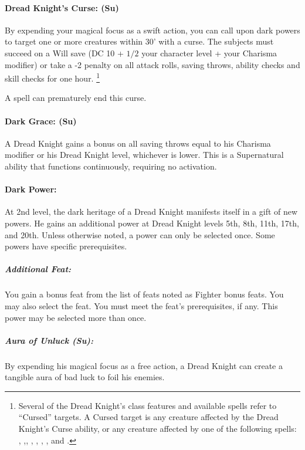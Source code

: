 \paragraph[Dread Knight's Curse]{Dread Knight's Curse: (Su)}
\label{sec:DreadKnightsCurse}
By expending your magical focus as a swift action, you can call upon dark powers to target one or more creatures within 30' with a curse.
The subjects must succeed on a Will save (DC 10 + $1/2$ your character level + your Charisma modifier) or take a -2 penalty on all attack rolls, saving throws, ability checks and skill checks for one hour.
\footnote{Several of the Dread Knight's class features and available spells refer to ``Cursed'' targets. A Cursed target is any creature affected by the Dread Knight's Curse ability, or any creature affected by one of the following spells: , ,, , , , ,  and .}

A  spell can prematurely end this curse.

\paragraph{Dark Grace: (Su)} A Dread Knight gains a bonus on all saving throws equal to his Charisma modifier or his Dread Knight level, whichever is lower.
This is a Supernatural ability that functions continuously, requiring no activation.

\paragraph{Dark Power:}
At 2nd level, the dark heritage of a Dread Knight manifests itself in a gift of new powers. He gains an additional power at Dread Knight levels 5th, 8th, 11th, 17th, and 20th. Unless otherwise noted, a power can only be selected once. Some powers have specific prerequisites.

\subparagraph{Additional Feat:}
You gain a bonus feat from the list of feats noted as Fighter bonus feats. You may also select the  feat. You must meet the feat's prerequisites, if any.
This power may be selected more than once.

\subparagraph{Aura of Unluck (Su):} 
By expending his magical focus as a free action, a Dread Knight can create a tangible aura of bad luck to foil his enemies. 

